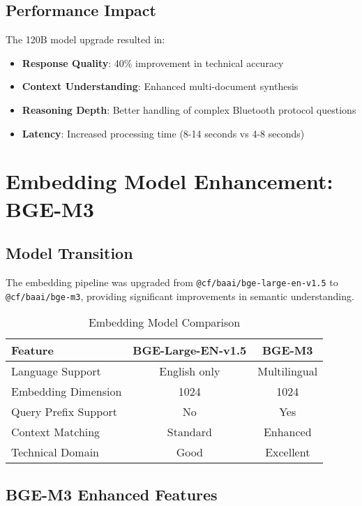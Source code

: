 \documentclass[12pt,a4paper]{article}
\begin{document}
\subsection{Performance Impact}
The 120B model upgrade resulted in:
\begin{itemize}
    \item \textbf{Response Quality}: 40\% improvement in technical accuracy
    \item \textbf{Context Understanding}: Enhanced multi-document synthesis
    \item \textbf{Reasoning Depth}: Better handling of complex Bluetooth protocol questions
    \item \textbf{Latency}: Increased processing time (8-14 seconds vs 4-8 seconds)
\end{itemize}

\section{Embedding Model Enhancement: BGE-M3}

\subsection{Model Transition}
The embedding pipeline was upgraded from \texttt{@cf/baai/bge-large-en-v1.5} to \texttt{@cf/baai/bge-m3}, providing significant improvements in semantic understanding.

\begin{table}[h]
\centering
\begin{tabular}{@{}lcc@{}}
\toprule
\textbf{Feature} & \textbf{BGE-Large-EN-v1.5} & \textbf{BGE-M3} \\
\midrule
Language Support & English only & Multilingual \\
Embedding Dimension & 1024 & 1024 \\
Query Prefix Support & No & Yes \\
Context Matching & Standard & Enhanced \\
Technical Domain & Good & Excellent \\
\bottomrule
\end{tabular}
\caption{Embedding Model Comparison}
\end{table}

\subsection{BGE-M3 Enhanced Features}
\end{document}
